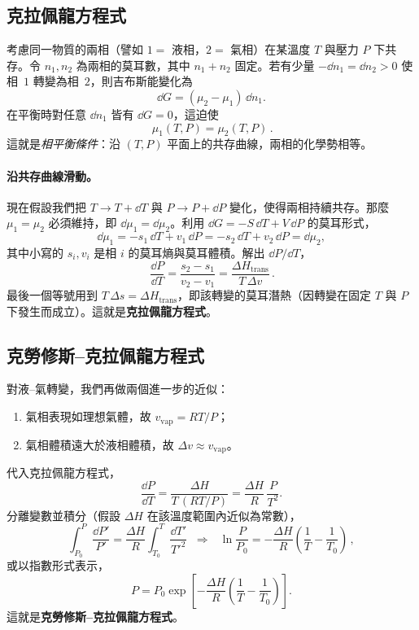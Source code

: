 \subsection{克拉佩龍方程式}

考慮同一物質的兩相（譬如 $1 =$ 液相，$2 =$ 氣相）在某溫度 $T$ 與壓力 $P$ 下共存。令 $n_1,n_2$ 為兩相的莫耳數，其中 $n_1+n_2$ 固定。若有少量 $-\dd n_1 = \dd n_2 > 0$ 使相~$1$ 轉變為相~$2$，則吉布斯能變化為
\[
    \dd G = (\mu_2 - \mu_1)\,\dd n_1.
\]
在平衡時對任意 $\dd n_1$ 皆有 $\dd G = 0$，這迫使
\[
    \boxed{\,\mu_1(T,P) = \mu_2(T,P)\,}.
\]
這就是\emph{相平衡條件}：沿 $(T,P)$ 平面上的共存曲線，兩相的化學勢相等。

\paragraph{沿共存曲線滑動。}
現在假設我們把 $T\to T+\dd T$ 與 $P\to P+\dd P$ 變化，使得兩相持續共存。那麼 $\mu_1=\mu_2$ 必須維持，即 $\dd\mu_1=\dd\mu_2$。利用 $\dd G = -S\,\dd T + V\,\dd P$ 的莫耳形式，
\[
    \dd\mu_1 = -s_1\,\dd T + v_1\,\dd P
    = -s_2\,\dd T + v_2\,\dd P
    = \dd\mu_2,
\]
其中小寫的 $s_i, v_i$ 是相 $i$ 的莫耳熵與莫耳體積。解出 $\dd P/\dd T$，
\[
    \boxed{\,\frac{\dd P}{\dd T} = \frac{s_2 - s_1}{v_2 - v_1} = \frac{\Delta H_{\text{trans}}}{T\,\Delta v}\,}.
\]
最後一個等號用到 $T\,\Delta s = \Delta H_{\text{trans}}$，即該轉變的莫耳潛熱（因轉變在固定 $T$ 與 $P$ 下發生而成立）。這就是\textbf{克拉佩龍方程式}。

\subsection{克勞修斯--克拉佩龍方程式}

對液--氣轉變，我們再做兩個進一步的近似：
\begin{enumerate}[label=(\roman*)]
    \item 氣相表現如理想氣體，故 $v_{\text{vap}} = RT/P$；
    \item 氣相體積遠大於液相體積，故 $\Delta v \approx v_{\text{vap}}$。
\end{enumerate}
代入克拉佩龍方程式，
\[
    \frac{\dd P}{\dd T} = \frac{\Delta H}{T\,(RT/P)} = \frac{\Delta H}{R}\,\frac{P}{T^{2}}.
\]
分離變數並積分（假設 $\Delta H$ 在該溫度範圍內近似為常數），
\[
    \int_{P_0}^{P} \frac{\dd P'}{P'} = \frac{\Delta H}{R}\int_{T_0}^{T} \frac{\dd T'}{T'^{2}}
    \;\;\Longrightarrow\;\;
    \boxed{\,\ln\!\frac{P}{P_0} = -\frac{\Delta H}{R}\!\left(\frac{1}{T} - \frac{1}{T_0}\right)\,},
\]
或以指數形式表示，
\[
    P = P_0 \exp\!\left[-\frac{\Delta H}{R}\!\left(\frac{1}{T} - \frac{1}{T_0}\right)\right].
\]
這就是\textbf{克勞修斯--克拉佩龍方程式}。
